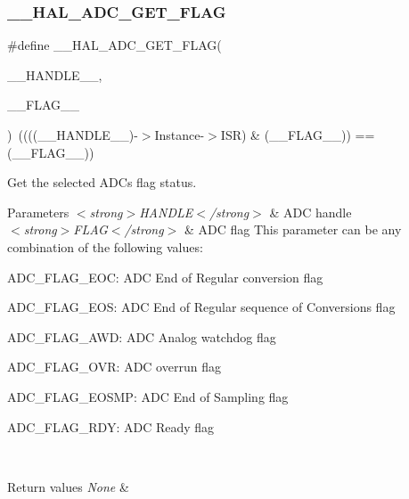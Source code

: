\subsubsection{\texorpdfstring{\+\_\+\+\_\+\+H\+A\+L\+\_\+\+A\+D\+C\+\_\+\+G\+E\+T\+\_\+\+F\+L\+AG}{\_\_HAL\_ADC\_GET\_FLAG}}
{\footnotesize\ttfamily \#define \+\_\+\+\_\+\+H\+A\+L\+\_\+\+A\+D\+C\+\_\+\+G\+E\+T\+\_\+\+F\+L\+AG(\begin{DoxyParamCaption}\item[{}]{\+\_\+\+\_\+\+H\+A\+N\+D\+L\+E\+\_\+\+\_\+,  }\item[{}]{\+\_\+\+\_\+\+F\+L\+A\+G\+\_\+\+\_\+ }\end{DoxyParamCaption})~((((\+\_\+\+\_\+\+H\+A\+N\+D\+L\+E\+\_\+\+\_\+)-\/$>$Instance-\/$>$I\+SR) \& (\+\_\+\+\_\+\+F\+L\+A\+G\+\_\+\+\_\+)) == (\+\_\+\+\_\+\+F\+L\+A\+G\+\_\+\+\_\+))}



Get the selected A\+DC\textquotesingle{}s flag status. 


\begin{DoxyParams}{Parameters}
{\em $<$strong$>$\+H\+A\+N\+D\+L\+E$<$/strong$>$} & A\+DC handle \\
\hline
{\em $<$strong$>$\+F\+L\+A\+G$<$/strong$>$} & A\+DC flag This parameter can be any combination of the following values\+: \begin{DoxyItemize}
\item A\+D\+C\+\_\+\+F\+L\+A\+G\+\_\+\+E\+OC\+: A\+DC End of Regular conversion flag \item A\+D\+C\+\_\+\+F\+L\+A\+G\+\_\+\+E\+OS\+: A\+DC End of Regular sequence of Conversions flag \item A\+D\+C\+\_\+\+F\+L\+A\+G\+\_\+\+A\+WD\+: A\+DC Analog watchdog flag \item A\+D\+C\+\_\+\+F\+L\+A\+G\+\_\+\+O\+VR\+: A\+DC overrun flag \item A\+D\+C\+\_\+\+F\+L\+A\+G\+\_\+\+E\+O\+S\+MP\+: A\+DC End of Sampling flag \item A\+D\+C\+\_\+\+F\+L\+A\+G\+\_\+\+R\+DY\+: A\+DC Ready flag \end{DoxyItemize}
\\
\hline
\end{DoxyParams}

\begin{DoxyRetVals}{Return values}
{\em None} & \\
\hline
\end{DoxyRetVals}
\mbox{\label{group___a_d_c___exported___macros_gaf29cd943cb451e4ed1f07bd7d4854fb0}} 
